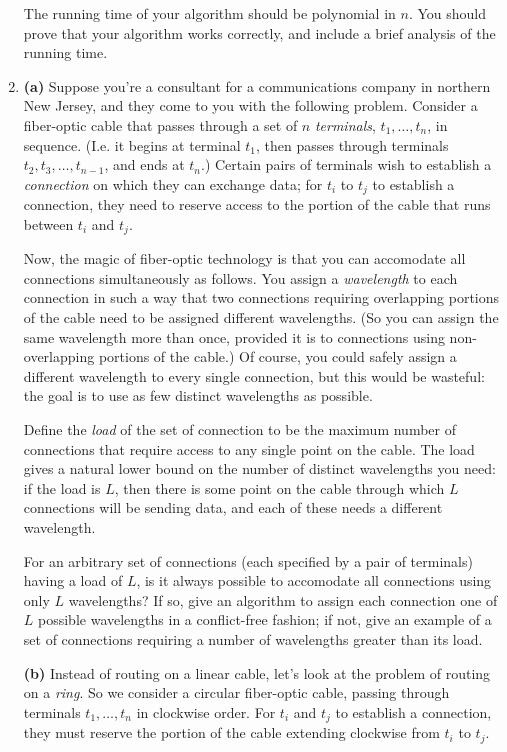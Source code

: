 \documentclass[12pt]{article}
\def\gap{0.2in}
\begin{document}
\begin{enumerate}
The running time of your algorithm should be polynomial in $n$.
You should prove that your algorithm works correctly, and include a
brief analysis of the running time.




\item 

{\bf (a)}
Suppose you're a consultant for a communications
company in northern New Jersey, and they come to
you with the following problem.
Consider a fiber-optic cable that passes through
a set of $n$ {\em terminals}, $t_1, \ldots, t_n$, in sequence.
(I.e. it begins at terminal $t_1$, then passes through
terminals $t_2, t_3, \ldots, t_{n-1}$, and ends at $t_n$.)
Certain pairs of terminals wish to establish a
{\em connection} on which they can exchange data;
for $t_i$ to $t_j$ to establish a connection,
they need to reserve access to the portion of
the cable that runs between $t_i$ and $t_j$.

Now, the magic of fiber-optic technology is that you can
accomodate all connections simultaneously as follows.
You assign a {\em wavelength} to each connection
in such a way that two connections requiring overlapping
portions of the cable need to be assigned different wavelengths.
(So you can assign the same wavelength more than once, provided it
is to connections using non-overlapping portions of the cable.)
Of course, you could safely assign a different wavelength
to every single connection, but this would be wasteful:
the goal is to use as few distinct wavelengths as possible.

Define the {\em load} of the set of connection to be
the maximum number of connections that require access
to any single point on the cable.
The load gives a natural lower bound on the number of
distinct wavelengths you need: if the load is $L$,
then there is some point on the cable through which
$L$ connections will be sending data, and each of
these needs a different wavelength.

For an arbitrary set of connections (each specified by
a pair of terminals) having a load of $L$,
is it always possible to accomodate all connections
using only $L$ wavelengths?
If so, give an algorithm to assign each connection
one of $L$ possible wavelengths in a conflict-free fashion;
if not, give an example of a set of connections
requiring a number of wavelengths greater than its load.

\vskip \gap
{\bf (b)} Instead of routing on a linear cable,
let's look at the problem of routing on a {\em ring}.
So we consider a circular fiber-optic cable, passing through
terminals $t_1, \ldots, t_n$ in clockwise order.
For $t_i$ and $t_j$ to establish a connection, they must
reserve the portion of the cable extending clockwise
from $t_i$ to $t_j$.


\end{enumerate}
\end{document}
